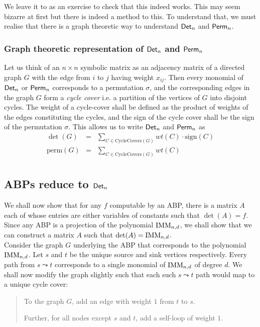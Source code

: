 We leave it to as an exercise to check that this indeed works. This may seem bizarre at first but there is indeed a method to this. To understand that, we must realise that there is a graph theoretic way to understand $\operatorname{\mathsf{Det}}_n$ and $\operatorname{\mathsf{Perm}}_n$. 

\subsubsection*{Graph theoretic representation of $\operatorname{\mathsf{Det}}_n$ and $\operatorname{\mathsf{Perm}}_n$}

Let us think of an $n\times n$ symbolic matrix as an adjacency matrix of a directed graph $G$ with the edge from $i$ to $j$ having weight $x_{ij}$. 
Then every monomial of $\operatorname{\mathsf{Det}}_n$ or $\operatorname{\mathsf{Perm}}_n$ corresponds to a permutation $\sigma$, and the corresponding edges in the graph $G$ form a \emph{cycle cover} i.e. a partition of the vertices of $G$ into disjoint cycles. 
The weight of a cycle-cover shall be defined as the product of weights of the edges constituting the cycles, and the sign of the cycle cover shall be the sign of the permutation $\sigma$. 
This allows us to write $\operatorname{\mathsf{Det}}_n$ and $\operatorname{\mathsf{Perm}}_n$ as
\begin{eqnarray*}
\det(G) & = & \sum_{C\in \mathrm{CycleCovers}(G)} wt(C) \cdot \mathrm{sign}(C)\\
\mathrm{perm}(G) & = & \sum_{C\in \mathrm{CycleCovers}(G)} wt(C) \\
\end{eqnarray*}

\subsection{ABPs reduce to $\operatorname{\mathsf{Det}}_n$}

We shall now show that for any $f$ computable by an ABP, there is a matrix  $A$ each of whose entries are either variables of constants such that $\det(A) = f$. 
Since any ABP is a projection of the polynomial $\operatorname{\mathrm{IMM}}_{n,d}$, we shall show that we can construct a matrix  $A$  such that $\det(A) = \operatorname{\mathrm{IMM}}_{n,d}$. \\

Consider the graph $G$ underlying the ABP that corresponds to the polynomial $\operatorname{\mathrm{IMM}}_{n,d}$. 
Let $s$ and $t$ be the unique source and sink vertices respectively. 
Every path from $s\leadsto t$ corresponds to a single monomial of $\operatorname{\mathrm{IMM}}_{n,d}$ of degree $d$. 
We shall now modify the graph slightly such that each such $s\leadsto t$ path would map to a unique cycle cover:

\begin{quote}
  To the graph $G$, add an edge with weight $1$ from $t$ to $s$. 

  Further, for all nodes except $s$ and $t$, add a self-loop of weight $1$. 
\end{quote}


